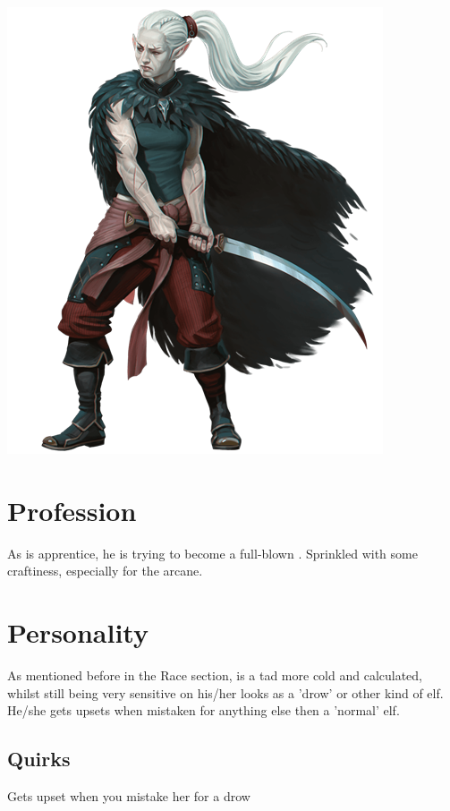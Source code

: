     \vfill
    \includegraphics[width=\linewidth-2ex]{images/shadar-kai.png}
    \vfill
    \newpage
  
    \section{Profession}
    As \Name{} is \Master{} apprentice, he is trying to become a full-blown \Class{}. Sprinkled with some craftiness, especially for the arcane.

    \section{Personality}
    As mentioned before in the Race section, \Name{} is a tad more cold and calculated, whilst still being very sensitive on his/her looks as a 'drow' or other kind of elf. He/she gets upsets when mistaken for anything else then a 'normal' elf.

    \subsection{Quirks}
    Gets upset when you mistake her for a drow

